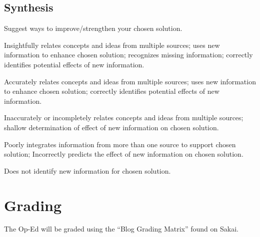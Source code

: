 \documentclass{tufte-handout}\usepackage[]{graphicx}\usepackage[]{color}
\newenvironment{enumerate*}%
  {\begin{enumerate}%
    \setlength{\itemsep}{0pt}%
    \setlength{\parskip}{0pt}}%
  {\end{enumerate}}
\begin{document}
\subsection{Synthesis}

Suggest ways to improve/strengthen your chosen solution.

\begin{enumerate*}
	\item Insightfully relates concepts and ideas from multiple sources; uses new information to enhance chosen solution; recognizes missing information; correctly identifies potential effects of new information.	
	\item Accurately relates concepts and ideas from multiple sources; uses new information to enhance chosen solution; correctly identifies potential effects of new information.	
	\item Inaccurately or incompletely relates concepts and ideas from multiple sources; shallow determination of effect of new information on chosen solution.	
	\item Poorly integrates information from more than one source to support chosen solution; Incorrectly predicts the effect of new information on chosen solution.	
	\item Does not identify new information for chosen solution.	
\end{enumerate*}

\section{Grading}

The Op-Ed will be graded using the ``Blog Grading Matrix'' found on Sakai.
\end{document}
